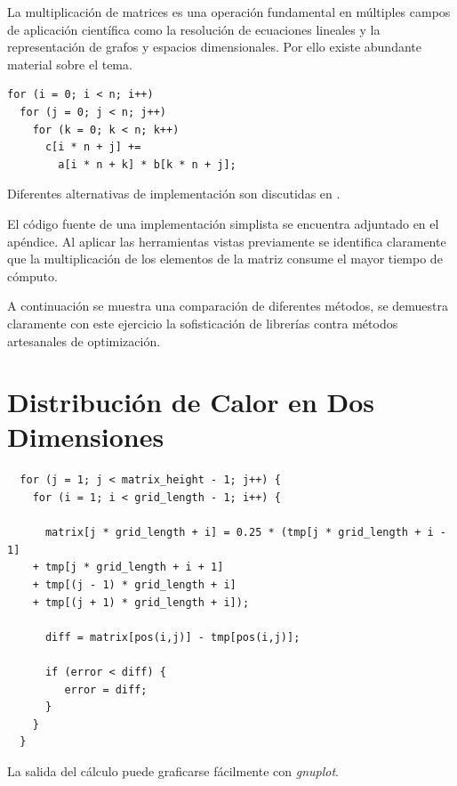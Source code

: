 \documentclass[a4paper]{report}
\begin{document}
La multiplicaci\'on de matrices es una operaci\'on fundamental en m\'ultiples
campos de aplicaci\'on cient\'ifica como la resoluci\'on de ecuaciones
lineales y la representaci\'on de grafos y espacios dimensionales. Por ello
existe abundante material sobre el tema.

\begin{verbatim}
for (i = 0; i < n; i++)
  for (j = 0; j < n; j++)
    for (k = 0; k < n; k++)
      c[i * n + j] += 
        a[i * n + k] * b[k * n + j];
\end{verbatim}

Diferentes alternativas de implementaci\'on son discutidas en
\cite{mm-matrixmultiplicationtool}.

\bigskip

El c\'odigo fuente de una implementaci\'on simplista se encuentra adjuntado en
el ap\'endice. Al aplicar las herramientas vistas previamente se identifica
claramente que la multiplicaci\'on de los elementos de la matriz consume el
mayor tiempo de c\'omputo.

\bigskip

A continuaci\'on se muestra una comparaci\'on de diferentes m\'etodos, se
demuestra claramente con este ejercicio la sofisticaci\'on de librer\'ias
contra m\'etodos artesanales de optimizaci\'on.

\section{Distribuci\'on de Calor en Dos Dimensiones}

\begin{verbatim}
  for (j = 1; j < matrix_height - 1; j++) {
    for (i = 1; i < grid_length - 1; i++) {
      
      matrix[j * grid_length + i] = 0.25 * (tmp[j * grid_length + i - 1]
    + tmp[j * grid_length + i + 1]
    + tmp[(j - 1) * grid_length + i]
    + tmp[(j + 1) * grid_length + i]);

      diff = matrix[pos(i,j)] - tmp[pos(i,j)];

      if (error < diff) {
         error = diff;
      }
    }
  }
\end{verbatim}

La salida del c\'alculo puede graficarse f\'acilmente con {\it gnuplot}.
\end{document}

